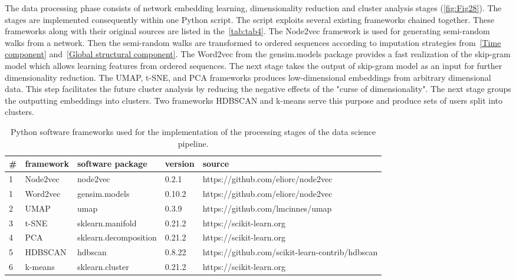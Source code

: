 The data processing phase consists of network embedding learning, dimensionality reduction and cluster analysis stages (\autoref{fig:Fig28}). The stages are implemented consequently within one Python script. The script exploits several existing frameworks chained together. These frameworks along with their original sources are listed in the~\autoref{tab:tab4}. The Node2vec framework is used for generating semi-random walks from a network. Then the semi-random walks are transformed to ordered sequences according to imputation strategies from~\ref{Time component} and~\ref{Global structural component}. The Word2vec from the gensim.models package provides a fast realization of the skip-gram model which allows learning features from ordered sequences. The next stage takes the output of skip-gram model as an input for further dimensionality reduction. The UMAP, t-SNE, and PCA frameworks produces low-dimensional embeddings from arbitrary dimensional data. This step facilitates the future cluster analysis by reducing the negative effects of the "curse of dimensionality". The next stage groups the outputting embeddings into clusters. Two frameworks HDBSCAN and k-means serve this purpose and produce sets of users split into clusters.
\begin{table}
\begin{center}
\begin{tabular}{ | m{0.7em} | m{2cm} | m{3.7cm} | m{1.5cm}| m{7cm} |} 
\hline
\textbf{\#} & \textbf{framework} & \textbf{software package} & \textbf{version} & \textbf{source} \\ 
\hline
1 & Node2vec & node2vec & 0.2.1 & https://github.com/eliorc/node2vec \\
\hline
1 & Word2vec & gensim.models & 0.10.2 & https://github.com/eliorc/node2vec \\
\hline
2 & UMAP & umap~\cite{mcinnes2018umap-software} & 0.3.9 & https://github.com/lmcinnes/umap  \\
\hline
3 & t-SNE & sklearn.manifold & 0.21.2 & https://scikit-learn.org \\
\hline
4 & PCA & sklearn.decomposition & 0.21.2 & https://scikit-learn.org \\ 
\hline
5 & HDBSCAN & hdbscan~\cite{mcinnes2017hdbscan} & 0.8.22 & https://github.com/scikit-learn-contrib/hdbscan \\
\hline
6 & k-means & sklearn.cluster & 0.21.2 & https://scikit-learn.org \\
\hline
\end{tabular}
\caption {Python software frameworks used for the implementation of the processing stages of the data science pipeline.}
\label{tab:tab4}
\end{center}
\end {table}

